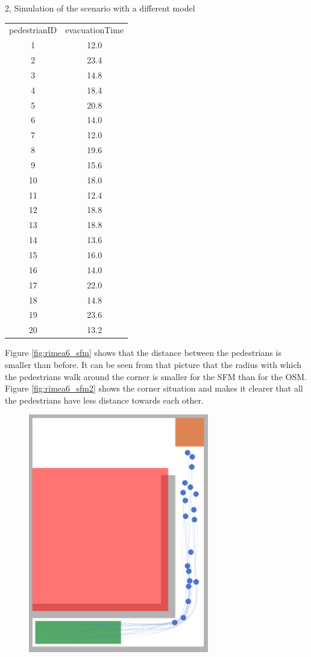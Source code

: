 \documentclass[10pt,a4paper]{article}
\begin{document}
\begin{task}{2, Simulation of the scenario with a different model}
\begin{itemize}
    \bigbreak
    \begin{tabular}{c|c}
    pedestrianID&evacuationTime\\
         1&  12.0\\
         2& 23.4\\
         3&14.8\\
         4&18.4\\
         5&20.8\\
         6&14.0\\
         7&12.0\\
         8&19.6\\
         9&15.6\\
         10&18.0\\
         11&12.4\\
         12&18.8\\
         13&18.8\\
         14&13.6\\
         15&16.0\\
         16&14.0\\
         17&22.0\\
         18&14.8\\
         19&23.6\\
         20&13.2\\
    \end{tabular}
    \bigbreak
    Figure \ref{fig:rimea6_sfm} shows that the distance between the pedestrians is smaller than before. It can be seen from that picture that the radius with which the pedestrians walk around the corner is smaller for the SFM than for the OSM. Figure \ref{fig:rimea6_sfm2} shows the corner situation and makes it clearer that all the pedestrians have less distance towards each other.
    \begin{figure}[H]
        \centering
        \includegraphics[width=0.7\textwidth]{pictures/sfm/rimeatest6.png}

\end{figure}
\end{itemize}
\end{task}
\end{document}
